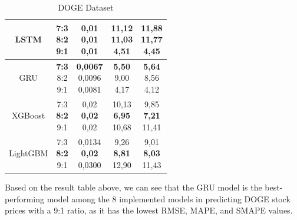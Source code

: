 \documentclass{ieeeojies}
\begin{document}
\begin{table}[H]
\begin{tabular*}{\linewidth}{@{\extracolsep{\fill}}|c|c|c|c|c|}
        \hline
        LSTM & \makecell{7:3 \\ 8:2 \\ \textbf{9:1}} & \makecell{0,01 \\ 0,01 \\ \textbf{0,01}} & \makecell{11,12 \\ 11,03 \\ \textbf{4,51}} & \makecell{11,88 \\ 11,77 \\ \textbf{4,45}} \\
        \hline
        GRU & \makecell{\textbf{7:3} \\ 8:2 \\ 9:1} & \makecell{\textbf{0,0067} \\ 0,0096 \\ 0,0081} & \makecell{\textbf{5,50} \\ 9,00 \\ 4,17} & \makecell{\textbf{5,64} \\ 8,56 \\ 4,12} \\
        \hline
        XGBoost &  \makecell{7:3 \\ \textbf{8:2} \\ 9:1} & \makecell{0,02 \\ \textbf{0,02} \\ 0,02} & \makecell{10,13 \\ \textbf{6,95} \\ 10,68} & \makecell{9,85 \\ \textbf{7,21} \\ 11,41} \\
        \hline
        LightGBM & \makecell{7:3 \\ \textbf{8:2} \\ 9:1} & \makecell{0,0134 \\ \textbf{0,02} \\ 0,0300} & \makecell{9,26 \\ \textbf{8,81} \\ 12,90} & \makecell{9,01 \\ \textbf{8,03} \\ 11,43} \\
        \hline
    \end{tabular*}
    \caption{DOGE Dataset}
    \label{table:4}
\end{table}
Based on the result table above, we can see that the GRU model is the best-performing model among the 8 implemented models in predicting DOGE stock prices with a 9:1 ratio, as it has the lowest RMSE, MAPE, and SMAPE values.
\end{document}

